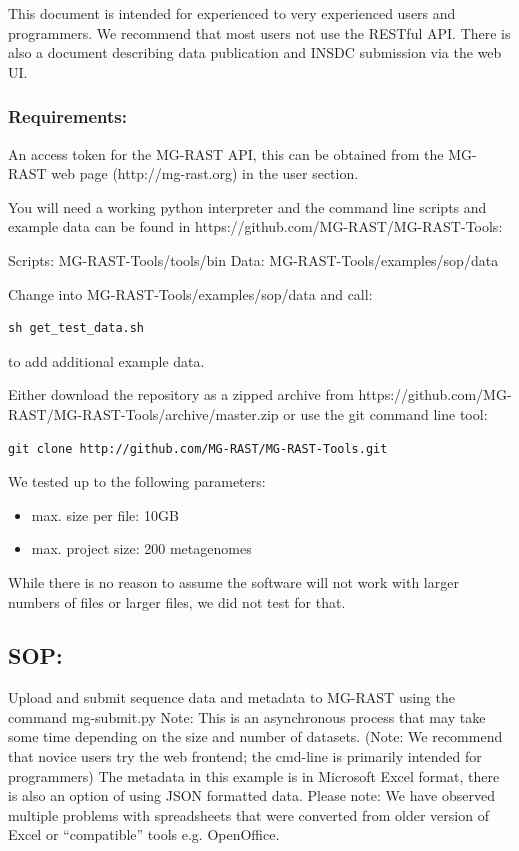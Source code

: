 \documentclass[12pt,fullpage]{report}
\begin{document}
This document is intended for experienced to very experienced users and programmers. We recommend that most users not use the RESTful API. There is also a document describing data publication and INSDC submission via the web UI.

\subsubsection{Requirements:}

An access token for the MG-RAST API, this can be obtained from the MG-RAST web page (http://mg-rast.org) in the user section.

You will need a working python interpreter and the command line scripts and example data can be found in https://github.com/MG-RAST/MG-RAST-Tools:

    Scripts: MG-RAST-Tools/tools/bin
    Data: MG-RAST-Tools/examples/sop/data

Change into MG-RAST-Tools/examples/sop/data and call:

\begin{lstlisting}
sh get_test_data.sh
\end{lstlisting}
to add additional example data.

Either download the repository as a zipped archive from https://github.com/MG-RAST/MG-RAST-Tools/archive/master.zip or use the git command line tool:

\begin{lstlisting}
git clone http://github.com/MG-RAST/MG-RAST-Tools.git
\end{lstlisting}
We tested up to the following parameters:

\begin{itemize}
\item    max. size per file: 10GB
\item    max. project size: 200 metagenomes
\end{itemize}

While there is no reason to assume the software will not work with larger numbers of files or larger files, we did not test for that.


\subsection{SOP:}

Upload and submit sequence data and metadata to MG-RAST using the command mg-submit.py Note: This is an asynchronous process that may take some time depending on the size and number of datasets. (Note: We recommend that novice users try the web frontend; the cmd-line is primarily intended for programmers) The metadata in this example is in Microsoft Excel format, there is also an option of using JSON formatted data. Please note: We have observed multiple problems with spreadsheets that were converted from older version of Excel or “compatible” tools e.g. OpenOffice.
\end{document}
